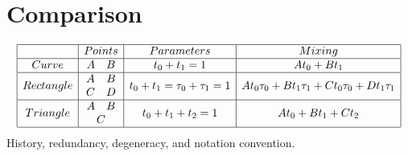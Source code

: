 
\section{Comparison}
\[\begin{array}{|c|c|c|c|}
	\hline
	&Points& Parameters & Mixing\\
	\hline
	Curve&\begin{matrix} A&B \end{matrix}& t_0+t_1=1& At_0+Bt_1\\
		\hline
	Rectangle&\begin{matrix} A&B\\C&D \end{matrix}& t_0+t_1=\tau_0+\tau_1=1 &At_0\tau_0+Bt_1\tau_1+Ct_0\tau_0+Dt_1\tau_1\\
		\hline
	Triangle&\begin{matrix} A&B\\\multicolumn{2}{c}{C} \end{matrix}& t_0+t_1+t_2=1 &At_0+Bt_1+Ct_2\\
		\hline
\end{array}\]
History, 
redundancy,
degeneracy,
and notation convention.
